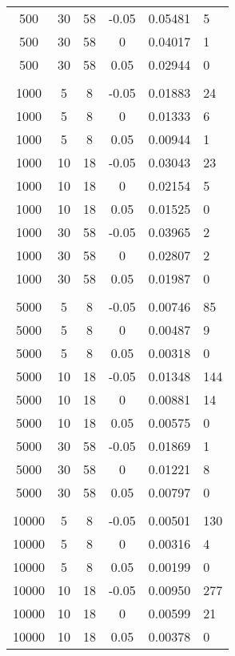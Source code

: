 \documentclass{article}
\begin{document}
\begin{center}
\begin{longtable}{ | c | c | c | c | c | L | }
500 & 30 & 58 & -0.05 & 0.05481 & 5 \\
500 & 30 & 58 & 0 & 0.04017 & 1 \\
500 & 30 & 58 & 0.05 & 0.02944 & 0 \\

& & & & & \\

1000 & 5 & 8 & -0.05 & 0.01883 & 24 \\
1000 & 5 & 8 & 0 & 0.01333 & 6 \\
1000 & 5 & 8 & 0.05 & 0.00944 & 1 \\

1000 & 10 & 18 & -0.05 & 0.03043 & 23 \\
1000 & 10 & 18 & 0 & 0.02154 & 5 \\
1000 & 10 & 18 & 0.05 & 0.01525 & 0 \\

1000 & 30 & 58 & -0.05 & 0.03965 & 2 \\
1000 & 30 & 58 & 0 & 0.02807 & 2 \\
1000 & 30 & 58 & 0.05 & 0.01987 & 0 \\

& & & & & \\

5000 & 5 & 8 & -0.05 & 0.00746 & 85 \\
5000 & 5 & 8 & 0 & 0.00487 & 9 \\
5000 & 5 & 8 & 0.05 & 0.00318 & 0 \\

5000 & 10 & 18 & -0.05 & 0.01348 & 144 \\
5000 & 10 & 18 & 0 & 0.00881 & 14 \\
5000 & 10 & 18 & 0.05 & 0.00575 & 0 \\

5000 & 30 & 58 & -0.05 & 0.01869 & 1 \\
5000 & 30 & 58 & 0 & 0.01221 & 8 \\
5000 & 30 & 58 & 0.05 & 0.00797 & 0 \\

& & & & & \\

10000 & 5 & 8 & -0.05 & 0.00501 & 130 \\
10000 & 5 & 8 & 0 & 0.00316 & 4 \\
10000 & 5 & 8 & 0.05 & 0.00199 & 0 \\

10000 & 10 & 18 & -0.05 & 0.00950 & 277 \\
10000 & 10 & 18 & 0 & 0.00599 & 21 \\
10000 & 10 & 18 & 0.05 & 0.00378 & 0 \\


\end{longtable}
\end{center}
\end{document}
